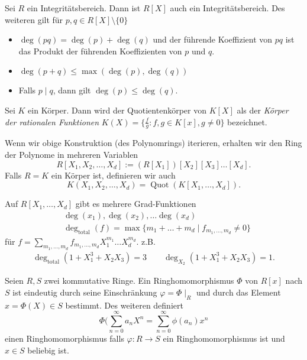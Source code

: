 \begin{proposition}
	Sei $R$ ein Integritätsbereich. Dann ist $R[X]$ auch ein Integritätsbereich.
	Des weiteren gilt für $p,q \in R[X] \setminus \{0\} $ 
	\begin{itemize}
		\item $\deg(pq) = \deg(p) + \deg(q)$ und der führende Koeffizient von $pq$ ist das Produkt der führenden Koeffizienten von $p$ und $q$.
		\item $\deg(p+q) \leq \max(\deg(p), \deg(q))$ 
		\item Falls $p \mid q$, dann gilt $\deg(p) \leq \deg(q)$.
	\end{itemize}
\end{proposition}


\begin{definition}
	Sei $K$ ein Körper. Dann wird der Quotientenkörper von $K[X]$ als der \emph{Körper der rationalen Funktionen}
	$K(X) = \{\frac{f}{g} : f,g \in K[x], g \neq 0\} $ bezeichnet.
\end{definition}

Wenn wir obige Konstruktion (des Polynomrings) iterieren, erhalten wir den Ring der Polynome in mehreren Variablen
\[
	R[X_1,X_2,\ldots,X_{d}] := (R[X_1])[X_2][X_3]\ldots[X_{d}]
.\] 
Falls $R = K$ ein Körper ist, definieren wir auch
\[
	K(X_1,X_2,\ldots,X_{d}) = \operatorname{Quot}(K[X_1,\ldots,X_{d}])
.\] 

\begin{remark}
	Auf $R[X_1,\ldots,X_{d}]$ gibt es mehrere Grad-Funktionen
	\begin{align*}
		&\deg(x_1), \deg(x_2), \ldots \deg(x_{d})\\
		&\deg_{\text{total}}(f) = \max \{m_1+\ldots+m_{d} \mid f_{m_1,\ldots,m_{d}} \neq 0\} 
	\end{align*}
	für $f = \sum_{m_1,\ldots,m_{d}} f_{m_1,\ldots,m_{d}} X_1^{m_1}\ldots X_{d}^{m_{d}}$.
	z.B.
	\begin{align*}
		\deg_{\text{total}}(1+X_1^{3} + X_2 X_3) = 3 \qquad \deg_{X_2}(1+X_1^{3} + X_2 X_3) = 1
	.\end{align*}
\end{remark}

\begin{theorem}
	Seien $R,S$ zwei kommutative Ringe. Ein Ringhomomorphismus $\Phi$ von $R[x]$ nach $S$ ist eindeutig durch seine Einschränkung
	$\varphi = \Phi \mid_{R}$ und durch das Element $x = \Phi(X) \in S$ bestimmt. Des weiteren definiert
	\[
		\Phi(\sum_{n=0}^{\infty} a_{n} X^{n} = \sum_{n=0}^{\infty} \phi(a_{n}) x^{n} \tag{$*$}
	\] 
	einen Ringhomomorphismus falls $\varphi: R \to S$ ein Ringhomomorphismus ist und $x \in S$ beliebig ist.
\end{theorem}


